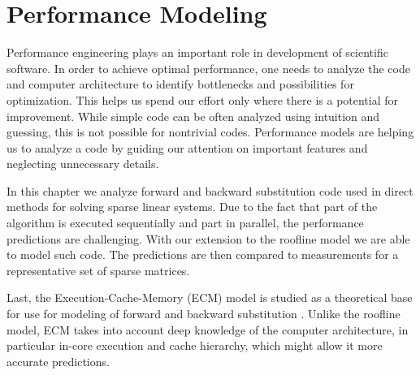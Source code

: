\chapter{Performance Modeling}


Performance engineering plays an important role in development of scientific software. In order to achieve optimal performance, one needs to analyze the code and computer architecture to identify bottlenecks and possibilities for optimization. This helps us spend our effort only where there is a potential for improvement.
While simple code can be often analyzed using intuition and guessing, this is not possible for nontrivial codes. Performance models are helping us to analyze a code by guiding our attention on important features and neglecting unnecessary details.

In this chapter we analyze forward and backward substitution code used in direct methods for solving sparse linear systems. Due to the fact that part of the algorithm is executed sequentially and part in parallel, the performance predictions are challenging. With our extension to the roofline model we are able to model such code. The predictions are then compared to measurements for a representative set of sparse matrices.

Last, the Execution-Cache-Memory (ECM) model is studied as a theoretical base for use for modeling of forward and backward substitution .
Unlike the roofline model, ECM takes into account deep knowledge of the computer architecture, in particular in-core execution and cache hierarchy, which might allow it more accurate predictions.

